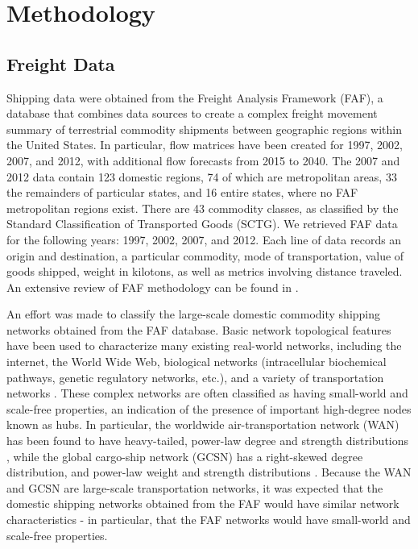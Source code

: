 \documentclass[12pt]{article}
\begin{document}
\section*{Methodology}

\subsection*{Freight Data}


Shipping data were obtained from the Freight Analysis Framework (FAF), a database that combines data sources to create a complex freight movement summary of terrestrial commodity shipments between geographic regions within the United States. In particular, flow matrices have been created for 1997, 2002, 2007, and 2012, with additional flow forecasts from 2015 to 2040.  The 2007 and 2012 data contain 123 domestic regions, 74 of which are metropolitan areas, 33 the remainders of particular states, and 16 entire states, where no FAF metropolitan regions exist.  There are 43 commodity classes, as classified by the Standard Classification of Transported Goods (SCTG).  We retrieved FAF data for the following years: 1997, 2002, 2007, and 2012. Each line of data records an origin and destination, a particular commodity, mode of transportation, value of goods shipped, weight in kilotons, as well as metrics involving distance traveled. An extensive review of FAF methodology can be found in \citet{FAF3manual}.


An effort was made to classify the large-scale domestic commodity shipping networks obtained from the FAF database.  Basic network topological features have been used to characterize many existing real-world networks, including the internet, the World Wide Web, biological networks (intracellular biochemical pathways, genetic regulatory networks, etc.), and a variety of transportation networks \citep{Barrat2008}.  These complex networks are often classified as having small-world and scale-free properties, an indication of the presence of important high-degree nodes known as hubs.  In particular, the worldwide air-transportation network (WAN) has been found to have heavy-tailed, power-law degree and strength distributions \citep{Barrat2004, Guimera2004}, while the global cargo-ship network (GCSN) has a right-skewed degree distribution, and power-law weight and strength distributions \citep{Kaluza2009}.  Because the WAN and GCSN are large-scale transportation networks, it was expected that the domestic shipping networks obtained from the FAF would have similar network characteristics - in particular, that the FAF networks would have small-world and scale-free properties.
\end{document}
